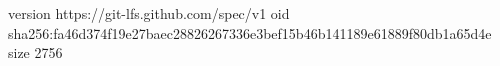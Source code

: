 version https://git-lfs.github.com/spec/v1
oid sha256:fa46d374f19e27baec28826267336e3bef15b46b141189e61889f80db1a65d4e
size 2756
